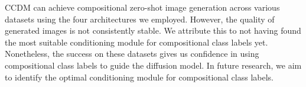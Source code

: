 CCDM can achieve compositional zero-shot image generation across various datasets using the four architectures we employed. However, the quality of generated images is not consistently stable. We attribute this to not having found the most suitable conditioning module for compositional class labels yet. Nonetheless, the success on these datasets gives us confidence in using compositional class labels to guide the diffusion model. In future research, we aim to identify the optimal conditioning module for compositional class labels.

